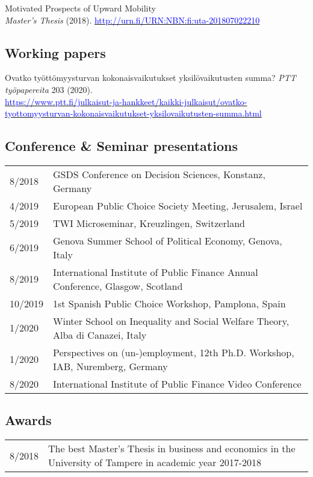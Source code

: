 \documentclass[16pt]{article}
\begin{document}
\noindent Motivated Prospects of Upward Mobility \\
\noindent \textit{Master's Thesis} (2018). \href{http://urn.fi/URN:NBN:fi:uta-201807022210}{\textcolor{blue}{http://urn.fi/URN:NBN:fi:uta-201807022210}}

\subsection*{Working papers}

\noindent Ovatko ty\"{o}tt\"{o}myysturvan kokonaisvaikutukset yksil\"{o}vaikutusten summa?
\noindent \textit{PTT ty\"{o}papereita} 203 (2020). \\ \href{https://www.ptt.fi/julkaisut-ja-hankkeet/kaikki-julkaisut/ovatko-tyottomyysturvan-kokonaisvaikutukset-yksilovaikutusten-summa.html} {\textcolor{blue}{https://www.ptt.fi/julkaisut-ja-hankkeet/kaikki-julkaisut/ovatko-tyottomyysturvan-kokonaisvaikutukset-yksilovaikutusten-summa.html}}

\subsection*{Conference \& Seminar presentations}
\begin{tabular}{@{}p{1.5in}p{5in}}
8/2018             & GSDS Conference on Decision Sciences, Konstanz, Germany\\
4/2019             & European Public Choice Society Meeting, Jerusalem, Israel\\
5/2019             & TWI Microseminar, Kreuzlingen, Switzerland \\
6/2019             & Genova Summer School of Political Economy, Genova, Italy \\
8/2019             & International Institute of Public Finance Annual Conference, Glasgow, Scotland \\
10/2019           & 1st Spanish Public Choice Workshop, Pamplona, Spain \\
1/2020             & Winter School on Inequality and Social Welfare Theory, Alba di Canazei, Italy \\
1/2020             & Perspectives on (un-)employment, 12th Ph.D. Workshop, IAB, Nuremberg, Germany \\
8/2020             & International Institute of Public Finance Video Conference
\end{tabular}

\subsection*{Awards} 
\begin{tabular}{@{}p{1.5in}p{5in}}
8/2018           & The best Master's Thesis in business and economics in the University of Tampere in academic year 2017-2018 \\
\end{tabular}
\end{document}
